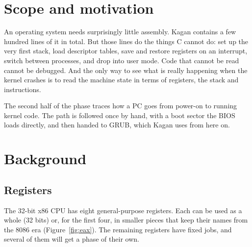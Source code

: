 \documentclass[11pt,a4paper]{article}
\begin{document}


\section{Scope and motivation}

An operating system needs surprisingly little assembly. Kagan contains a few hundred lines of it in total. But those lines do the things C cannot do: set up the very first stack, load descriptor
tables, save and restore registers on an interrupt, switch between processes, and drop into user mode. Code that cannot be
read cannot be debugged. And the only way to see what is really happening when the kernel crashes is to
read the machine state in terms of registers, the stack and instructions.

The second half of the phase traces how a PC goes from power-on to running kernel code. The path is followed once by
hand, with a boot sector the BIOS loads directly, and then handed to GRUB, which Kagan uses from here on.

\section{Background}

\subsection{Registers}

The 32-bit x86 CPU has eight general-purpose registers. Each can be used as a whole (32 bits) or, for the first
four, in smaller pieces that keep their names from the 8086 era (Figure~\ref{fig:eax}). The remaining registers
have fixed jobs, and several of them will get a phase of their own.
\end{document}
